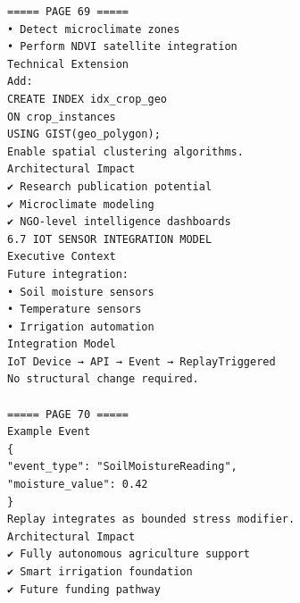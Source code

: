 \documentclass{article}
\begin{document}
\begin{verbatim}
===== PAGE 69 =====
• Detect microclimate zones
• Perform NDVI satellite integration
Technical Extension
Add:
CREATE INDEX idx_crop_geo
ON crop_instances
USING GIST(geo_polygon);
Enable spatial clustering algorithms.
Architectural Impact
✔ Research publication potential
✔ Microclimate modeling
✔ NGO-level intelligence dashboards
6.7 IOT SENSOR INTEGRATION MODEL
Executive Context
Future integration:
• Soil moisture sensors
• Temperature sensors
• Irrigation automation
Integration Model
IoT Device → API → Event → ReplayTriggered
No structural change required.

===== PAGE 70 =====
Example Event
{
"event_type": "SoilMoistureReading",
"moisture_value": 0.42
}
Replay integrates as bounded stress modifier.
Architectural Impact
✔ Fully autonomous agriculture support
✔ Smart irrigation foundation
✔ Future funding pathway
\end{verbatim}
\end{document}
